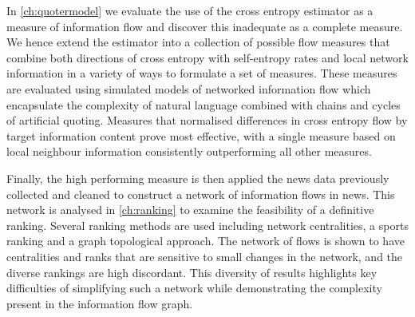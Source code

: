 In \autoref{ch:quotermodel} we evaluate the use of the cross entropy estimator as a measure of information flow and discover this inadequate as a complete measure. We hence extend the estimator into a collection of possible flow measures that combine both directions of cross entropy with self-entropy rates and local network information in a variety of ways to formulate a set of measures. These measures are evaluated using simulated models of networked information flow which encapsulate the complexity of natural language combined with chains and cycles of artificial quoting. Measures that normalised differences in cross entropy flow by target information content prove most effective, with a single measure based on local neighbour information consistently outperforming all other measures.

Finally, the high performing measure is then applied the news data previously collected and cleaned to construct a network of information flows in news. This network is analysed in \autoref{ch:ranking} to examine the feasibility of a definitive ranking. Several ranking methods are used including network centralities, a sports ranking and a graph topological approach. The network of flows is shown to have centralities and ranks that are sensitive to small changes in the network, and the diverse rankings are high discordant. This diversity of results highlights key difficulties of simplifying such a network while demonstrating the complexity present in the information flow graph. 


